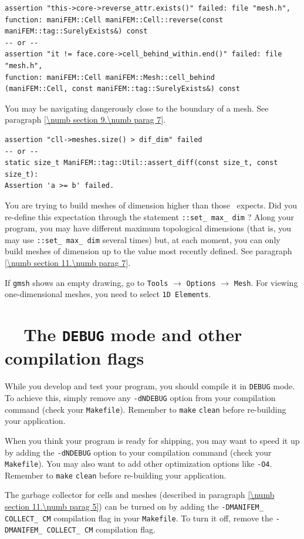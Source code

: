 \begin{Verbatim}[commandchars=\\\{\},formatcom=\small\tt,baselinestretch=0.94]
assertion "this->core->reverse_attr.exists()" failed: file "mesh.h",
function: maniFEM::Cell maniFEM::Cell::reverse(const maniFEM::tag::SurelyExists&) const
-- or --
assertion "it != face.core->cell_behind_within.end()" failed: file "mesh.h",
function: maniFEM::Cell maniFEM::Mesh::cell_behind
(maniFEM::Cell, const maniFEM::tag::SurelyExists&) const
\end{Verbatim}

You may be navigating dangerously close to the boundary of a mesh.
See paragraph \ref{\numb section 9.\numb parag 7}.

\begin{Verbatim}[commandchars=\\\{\},formatcom=\small\tt,baselinestretch=0.94]
assertion "cll->meshes.size() > dif_dim" failed
-- or --
static size_t ManiFEM::tag::Util::assert_diff(const size_t, const size_t):
Assertion 'a >= b' failed.
\end{Verbatim}

You are trying to build meshes of dimension higher than those \maniFEM\ expects.
Did you re-define this expectation through the statement
{\small\tt {}::set\_\,max\_\,dim} ?
Along your program, you may have different maximum topological dimensions (that is,
you may use {\small\tt {}::set\_\,max\_\,dim} several times) but, at each moment,
you can only build meshes of dimension up to the value most recently defined.
See paragraph \ref{\numb section 11.\numb parag 7}.
\medskip

If {\tt gmsh} shows an empty drawing, go to {\small\tt Tools} $\to$ {\small\tt Options} $\to$
{\small\tt Mesh}.
For viewing one-dimensional meshes, you need to select {\small\tt 1D Elements}.


\section{~~The {\tt DEBUG} mode and other compilation flags}
\label{\numb section 11.\numb parag 15}

While you develop and test your program, you should compile it in {\small\tt DEBUG} mode.
To achieve this, simply remove any {\small\tt -dNDEBUG} option from your compilation
command (check your {\small\tt Makefile}).
Remember to {\small\tt make} {\small\tt clean} before re-building your application.

When you think your program is ready for shipping, you may want to speed it up
by adding the {\small\tt -dNDEBUG} option to your compilation command
(check your {\small\tt Makefile}).
You may also want to add other optimization options like {\small\tt -O4}.
Remember to {\small\tt make} {\small\tt  clean} before re-building your application.

The garbage collector for cells and meshes (described in paragraph
\ref{\numb section 11.\numb parag 5}) can be turned on by adding the
{\small\tt -DMANIFEM\_\,COLLECT\_\,CM} compilation flag in your {\small\tt Makefile}.
To turn it off, remove the {\small\tt -DMANIFEM\_\,COLLECT\_\,CM} compilation flag.


